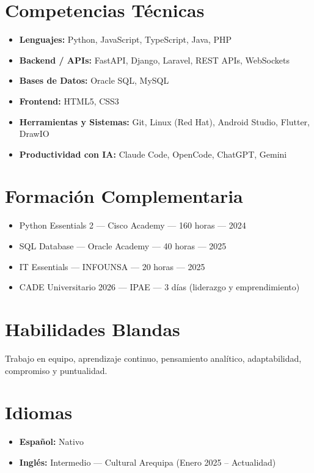 \documentclass[11pt,a4paper]{article}
\begin{document}
\section{Competencias Técnicas}
\begin{itemize}
  \item \textbf{Lenguajes:} Python, JavaScript, TypeScript, Java, PHP
  \item \textbf{Backend / APIs:} FastAPI, Django, Laravel, REST APIs, WebSockets
  \item \textbf{Bases de Datos:} Oracle SQL, MySQL
  \item \textbf{Frontend:} HTML5, CSS3
  \item \textbf{Herramientas y Sistemas:} Git, Linux (Red Hat), Android Studio, Flutter, DrawIO
  \item \textbf{Productividad con IA:} Claude Code, OpenCode, ChatGPT, Gemini
\end{itemize}

\section{Formación Complementaria}
\begin{itemize}
  \item Python Essentials 2 --- Cisco Academy --- 160 horas --- 2024
  \item SQL Database --- Oracle Academy --- 40 horas --- 2025
  \item IT Essentials --- INFOUNSA --- 20 horas --- 2025
  \item CADE Universitario 2026 --- IPAE --- 3 días (liderazgo y emprendimiento)
\end{itemize}

\section{Habilidades Blandas}
Trabajo en equipo, aprendizaje continuo, pensamiento analítico, adaptabilidad, compromiso y puntualidad.

\section{Idiomas}
\begin{itemize}
  \item \textbf{Español:} Nativo
  \item \textbf{Inglés:} Intermedio --- Cultural Arequipa (Enero 2025 -- Actualidad)
\end{itemize}
\end{document}
